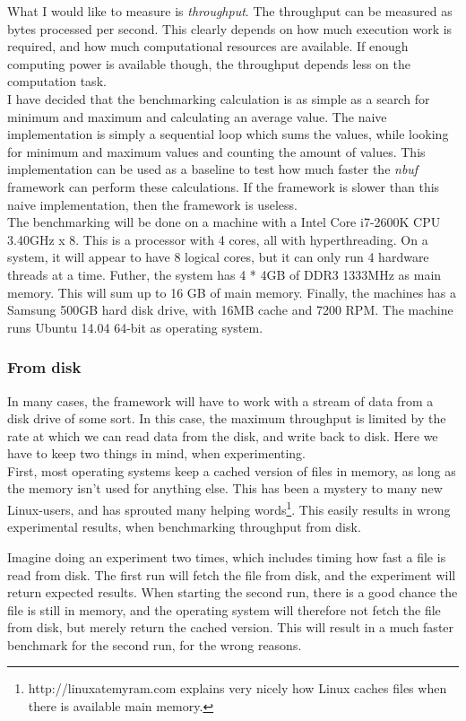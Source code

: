 \documentclass[a4paper]{article}
\newcommand{\nbuf}{\textit{nbuf} }
\begin{document}
What I would like to measure is \textit{throughput}. The throughput can be measured as bytes processed per second. This clearly depends on how much execution work is required, and how much computational resources are available. If enough computing power is available though, the throughput depends less on the computation task.\\

I have decided that the benchmarking calculation is as simple as a search for minimum and maximum and calculating an average value. The naive implementation is simply a sequential loop which sums the values, while looking for minimum and maximum values and counting the amount of values. This implementation can be used as a baseline to test how much faster the \nbuf framework can perform these calculations. If the framework is slower than this naive implementation, then the framework is useless.\\

The benchmarking will be done on a machine with a Intel Core i7-2600K CPU 3.40GHz x 8. This is a processor with 4 cores, all with hyperthreading. On a system, it will appear to have 8 logical cores, but it can only run 4 hardware threads at a time. Futher, the system has 4 * 4GB of DDR3 1333MHz as main memory. This will sum up to 16 GB of main memory. Finally, the machines has a Samsung 500GB hard disk drive, with 16MB cache and 7200 RPM. The machine runs Ubuntu 14.04 64-bit as operating system. 


\subsubsection{From disk}
In many cases, the framework will have to work with a stream of data from a disk drive of some sort. In this case, the maximum throughput is limited by the rate at which we can read data from the disk, and write back to disk. Here we have to keep two things in mind, when experimenting.\\

First, most operating systems keep a cached version of files in memory, as long as the memory isn't used for anything else. This has been a mystery to many new Linux-users, and has sprouted many helping words\footnote{http://linuxatemyram.com explains very nicely how Linux caches files when there is available main memory.}. This easily results in wrong experimental results, when benchmarking throughput from disk.

Imagine doing an experiment two times, which includes timing how fast a file is read from disk. The first run will fetch the file from disk, and the experiment will return expected results. When starting the second run, there is a good chance the file is still in memory, and the operating system will therefore not fetch the file from disk, but merely return the cached version. This will result in a much faster benchmark for the second run, for the wrong reasons.
\end{document}
